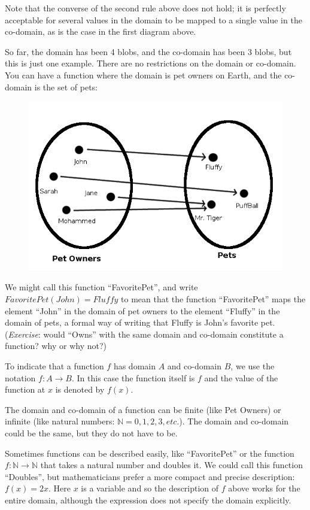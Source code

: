 \documentclass[UTF8]{book}
\begin{document}
\begin{CJK}{UTF8}{gbsn}
Note that the converse of the second rule above does not hold; it is perfectly acceptable for several values in the domain to be mapped to a single value in the co-domain, as is the case in the first diagram above.

So far, the domain has been 4 blobs, and the co-domain has been 3 blobs, but this is just one example. There are no restrictions on the domain or co-domain. You can have a function where the domain is pet owners on Earth, and the co-domain is the set of pets:

\begin{figure}[H]
\centering
\includegraphics[width=0.8\linewidth]{function_pets}
\end{figure}

We might call this function ``FavoritePet'', and write $FavoritePet(John) = Fluffy$ to mean that the function ``FavoritePet'' maps the element ``John'' in the domain of pet owners to the element ``Fluffy'' in the domain of pets, a formal way of writing that Fluffy is John's favorite pet. (\emph{Exercise}: would ``Owns'' with the same domain and co-domain constitute a function? why or why not?)

To indicate that a function $f$ has domain $A$ and co-domain $B$, we use the notation $f: A \rightarrow B$. In this case the function itself is $f$ and the value of the function at $x$ is denoted by $f(x)$.

The domain and co-domain of a function can be finite (like Pet Owners) or infinite (like natural numbers: $\mathbb{N} = {0, 1, 2, 3, etc.}$). The domain and co-domain could be the same, but they do not have to be.

Sometimes functions can be described easily, like ``FavoritePet'' or the function $f: \mathbb{N} \rightarrow \mathbb{N}$ that takes a natural number and doubles it. We could call this function ``Doubles'', but mathematicians prefer a more compact and precise description: $f(x) = 2x$. Here $x$ is a variable and so the description of $f$ above works for the entire domain, although the expression does not specify the domain explicitly.


\end{CJK}
\end{document}
